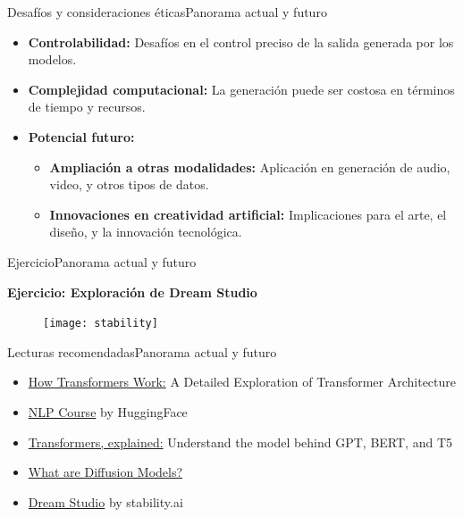 \documentclass[10pt,border=3pt,tikz]{beamer}
\begin{document}
    \begin{frame}{Desafíos y consideraciones éticas}{Panorama actual y futuro}
        \begin{itemize}
            \item \textbf{Controlabilidad:} Desafíos en el control preciso de la salida generada por los modelos.
            \item \textbf{Complejidad computacional:} La generación puede ser costosa en términos de tiempo y recursos.
            \item \textbf{Potencial futuro:}
            \begin{itemize}
                \item \textbf{Ampliación a otras modalidades:} Aplicación en generación de audio, video, y otros tipos de datos.
                \item \textbf{Innovaciones en creatividad artificial:} Implicaciones para el arte, el diseño, y la innovación tecnológica.
            \end{itemize}
        \end{itemize}
    \end{frame}
    
    \begin{frame}{Ejercicio}{Panorama actual y futuro}
        \begin{center}
            {\Large \textbf{Ejercicio: Exploración de Dream Studio}}
        \end{center}
        \begin{figure}
            \centering
            \texttt{[image: stability]}
        \end{figure}
    \end{frame}
    
    \begin{frame}{Lecturas recomendadas}{Panorama actual y futuro}
        \begin{itemize}
            \item \colorbox{blue!10}{\href{https://www.datacamp.com/tutorial/how-transformers-work}{How Transformers Work:}} A Detailed Exploration of Transformer Architecture            
            \item \colorbox{blue!10}{\href{https://huggingface.co/learn/nlp-course/es/chapter0/1}{NLP Course}} by HuggingFace
            \item \colorbox{blue!10}{\href{https://www.youtube.com/watch?v=SZorAJ4I-sA}{Transformers, explained:}} Understand the model behind GPT, BERT, and T5
            \item \colorbox{blue!10}{\href{https://lilianweng.github.io/posts/2021-07-11-diffusion-models/}{What are Diffusion Models?}}
            \item \colorbox{blue!10}{\href{https://beta.dreamstudio.ai/generate}{Dream Studio}} by stability.ai
        \end{itemize}
    \end{frame}
    
\end{document}
